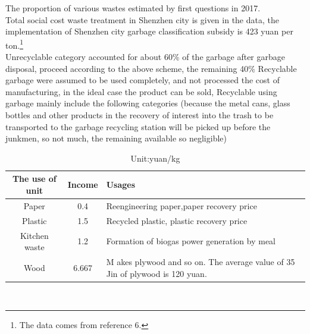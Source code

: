 \documentclass[UTF8]{article}
\begin{document}
\indent The proportion of various wastes estimated by first questions in 2017.\\
\indent Total social cost waste treatment in Shenzhen city is given in the data, the implementation of Shenzhen city garbage classification subsidy is 423 yuan per ton.\footnote{The data comes from reference 6.}\\
\indent Unrecyclable category accounted for about 60\% of the garbage after garbage disposal, proceed according to the above scheme, the remaining 40\% Recyclable garbage were assumed to be used completely, and not processed the cost of manufacturing, in the ideal case the product can be sold, Recyclable using garbage mainly include the following categories (because the metal cans, glass bottles and other products in the recovery of interest into the trash to be transported to the garbage recycling station will be picked up before the junkmen, so not much, the remaining available so negligible)\\
\begin{table}[h]
\caption{Unit:yuan/kg}
\begin{center}
\begin{tabular}{ccp{8cm}}
\hline
The use of unit&Income&Usages\\
\hline
Paper&0.4&Reengineering paper,paper recovery price\\
\hline
Plastic&1.5&Recycled plastic, plastic recovery price\\
\hline
Kitchen waste&1.2&Formation of biogas power generation by meal\\
\hline
Wood&6.667&M
akes plywood and so on. The average value of 35 Jin of plywood is 120 yuan.\\
\hline
\end{tabular}
\end{center}
\end{table}\\
\end{document}
